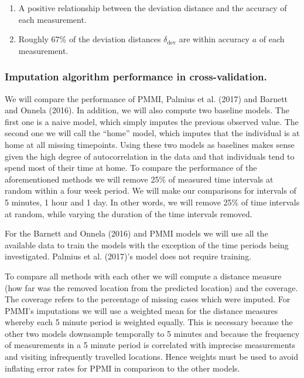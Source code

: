 \documentclass[man]{apa6}
\providecommand{\tightlist}{%
  \setlength{\itemsep}{0pt}\setlength{\parskip}{0pt}}
\theoremstyle{definition}
\theoremstyle{definition}
\theoremstyle{definition}
\theoremstyle{remark}
\begin{document}
\begin{enumerate}
\def\labelenumi{\arabic{enumi}.}
\tightlist
\item
  A positive relationship between the deviation distance and the
  accuracy of each measurement.
\item
  Roughly 67\% of the deviation distances \(\delta_{\text{dev}}\) are
  within accuracy \(a\) of each measurement.
\end{enumerate}

\subsubsection{Imputation algorithm performance in
cross-validation.}\label{imputation-algorithm-performance-in-cross-validation.}

We will compare the performance of PMMI, Palmius et al. (2017) and
Barnett and Onnela (2016). In addition, we will also compute two
baseline models. The first one is a naive model, which simply imputes
the previous observed value. The second one we will call the
\enquote{home} model, which imputes that the individual is at home at
all missing timepoints. Using these two models as baselines makes sense
given the high degree of autocorrelation in the data and that
individuals tend to spend most of their time at home. To compare the
performance of the aforementioned methods we will remove 25\% of
measured time intervals at random within a four week period. We will
make our comparisons for intervals of 5 minutes, 1 hour and 1 day. In
other words, we will remove 25\% of time intervals at random, while
varying the duration of the time intervals removed.

For the Barnett and Onnela (2016) and PMMI models we will use all the
available data to train the models with the exception of the time
periods being investigated. Palmius et al. (2017)'s model does not
require training.

To compare all methods with each other we will compute a distance
measure (how far was the removed location from the predicted location)
and the coverage. The coverage refers to the percentage of missing cases
which were imputed. For PMMI's imputations we will use a weighted mean
for the distance measures whereby each 5 minute period is weighted
equally. This is necessary because the other two models downsample
temporally to 5 minutes and because the frequency of measurements in a 5
minute period is correlated with imprecise measurements and visiting
infrequently travelled locations. Hence weights must be used to avoid
inflating error rates for PPMI in comparison to the other models.
\end{document}
